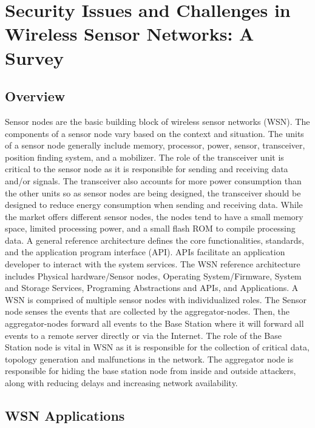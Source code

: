 \section {Security Issues and Challenges in Wireless Sensor Networks: A Survey}
\subsection {Overview}
\smallskip

Sensor nodes are the basic building block of wireless sensor networks (WSN). The components of a sensor node vary based on the context and situation. The units of a sensor node generally include memory, processor, power, sensor, transceiver, position finding system, and a mobilizer. The role of the transceiver unit is critical to the sensor node as it is responsible for sending and receiving data and/or signals. The transceiver also accounts for more power consumption than the other units so as sensor nodes are being designed, the transceiver should be designed to reduce energy consumption when sending and receiving data. While the market offers different sensor nodes, the nodes tend to have a small memory space, limited processing power, and a small flash ROM to compile processing data. A general reference architecture defines the core functionalities, standards, and the application program interface (API). APIs facilitate an application developer to interact with the system services. The WSN reference architecture includes Physical hardware/Sensor nodes, Operating System/Firmware, System and Storage Services, Programing Abstractions and APIs, and Applications. A WSN is comprised of multiple sensor nodes with individualized roles. The Sensor node senses the events that are collected by the aggregator-nodes. Then, the aggregator-nodes forward all events to the Base Station where it will forward all events to a remote server directly or via the Internet. The role of the Base Station node is vital in WSN as it is responsible for the collection of critical data, topology generation and malfunctions in the network. The aggregator node is responsible for hiding the base station node from inside and outside attackers, along with reducing delays and increasing network availability. 

\subsection {WSN Applications} 
\smallskip

